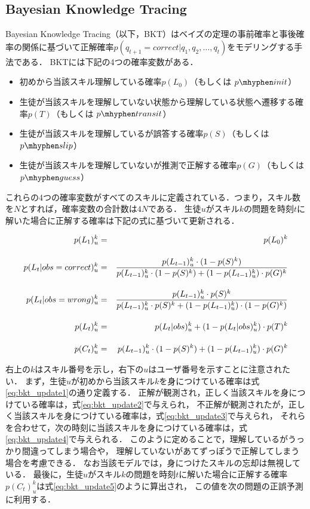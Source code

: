 \subsection{Bayesian Knowledge Tracing}
Bayesian Knowledge Tracing\cite{corbett1994knowledge}（以下，BKT）はベイズの定理の事前確率と事後確率の関係に基づいて正解確率$p(q_{t+1} = correct|q_1, q_2, \dots, q_t)$をモデリングする手法である．
BKTには下記の4つの確率変数がある．
\begin{itemize}
\item 初めから当該スキル理解している確率$p(L_0)$（もしくは $p\mhyphen init$）
\item 生徒が当該スキルを理解していない状態から理解している状態へ遷移する確率$p(T)$（もしくは $p\mhyphen transit$）
\item 生徒が当該スキルを理解しているが誤答する確率$p(S)$（もしくは $p\mhyphen slip$）
\item 生徒が当該スキルを理解していないが推測で正解する確率$p(G)$（もしくは $p\mhyphen guess$）
\end{itemize}
これらの4つの確率変数がすべてのスキルに定義されている．つまり，スキル数を$N$とすれば，確率変数の合計数は$4N$である．
生徒$u$がスキル$k$の問題を時刻$t$に解いた場合に正解する確率は下記の式に基づいて更新される．

\hspace*{-55pt}
\begin{eqnarray}
\label{eq:bkt_update1}
p(L_1)^{k}_{u} &=& p(L_0)^k \\[\eqnsp]
\label{eq:bkt_update2}
p(L_{t}|obs=correct)^{k}_{u} &=& \frac{ p(L_{t-1})^{k}_{u} \cdot (1 - p(S)^k) }{ p(L_{t-1})^{k}_{u} \cdot (1 - p(S)^k) + (1 - p(L_{t-1})^{k}_{u}) \cdot p(G)^k } \\[\eqnsp]
\label{eq:bkt_update3}
p(L_{t}|obs=wrong)^{k}_{u} &=& \frac{ p(L_{t-1})^{k}_{u} \cdot p(S)^k }{ p(L_{t-1})^{k}_{u} \cdot p(S)^k + (1 - p(L_{t-1})^{k}_{u}) \cdot (1 - p(G)^k) } \\[\eqnsp]
\label{eq:bkt_update4}
p(L_{t})^{k}_{u} &=& p(L_{t}|obs)^{k}_{u} + (1 - p(L_{t}|obs)^{k}_{u}) \cdot p(T)^k  \\[\eqnsp]
\label{eq:bkt_update5}
p(C_{t})^{k}_{u} &=& p(L_{t-1})^{k}_{u} \cdot (1 - p(S)^k) + (1 - p(L_{t-1})^k_{u}) \cdot p(G)^k
\end{eqnarray}
\endminipage\hfill
\vvspace
\vvspace


右上の$k$はスキル番号を示し，右下の$u$はユーザ番号を示すことに注意されたい．
まず，生徒$u$が初めから当該スキル$k$を身につけている確率は式\ref{eq:bkt_update1}の通り定義する．
正解が観測され，正しく当該スキルを身につけている確率は，式\ref{eq:bkt_update2}で与えられ，
不正解が観測されたが，正しく当該スキルを身につけている確率は，式\ref{eq:bkt_update3}で与えられ，
それらを合わせて，次の時刻に当該スキルを身につけている確率は，式\ref{eq:bkt_update4}で与えられる．
このように定めることで，理解しているがうっかり間違ってしまう場合や， 理解していないがあてずっぽうで正解してしまう場合を考慮できる．
なお当該モデルでは，身につけたスキルの忘却は無視している．
最後に，生徒$u$がスキル$k$の問題を時刻$t$に解いた場合に正解する確率$p(C_{t})^{k}_{u}$は式\ref{eq:bkt_update5}のように算出され，
この値を次の問題の正誤予測に利用する．
 
